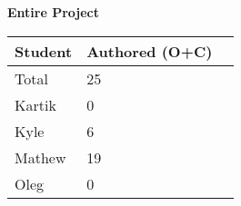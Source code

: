 \documentclass{article}
\begin{document}
    \begin{table}[H]
        \centering
        \textbf{Entire Project}\\
        \begin{tabular}{lll}
        \toprule
        \textbf{Student} & \textbf{Authored (O+C)}\\
        \midrule
        Total & 25\\
        Kartik & 0\\
        Kyle   & 6 \\
        Mathew & 19 \\
        Oleg   & 0 \\
        
        \bottomrule
        \end{tabular}
        \end{table}
\end{document}
